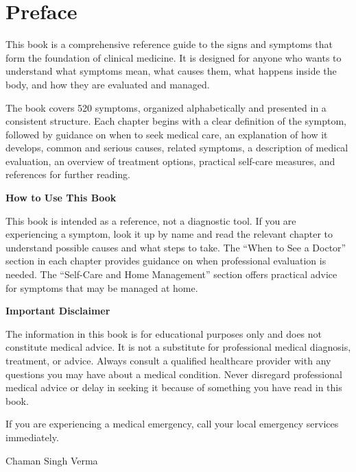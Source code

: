 \chapter*{Preface}

This book is a comprehensive reference guide to the signs and symptoms that form the foundation of clinical medicine. It is designed for anyone who wants to understand what symptoms mean, what causes them, what happens inside the body, and how they are evaluated and managed.

The book covers 520 symptoms, organized alphabetically and presented in a consistent structure. Each chapter begins with a clear definition of the symptom, followed by guidance on when to seek medical care, an explanation of how it develops, common and serious causes, related symptoms, a description of medical evaluation, an overview of treatment options, practical self-care measures, and references for further reading.

\medskip
\noindent\textbf{How to Use This Book}

This book is intended as a reference, not a diagnostic tool. If you are experiencing a symptom, look it up by name and read the relevant chapter to understand possible causes and what steps to take. The ``When to See a Doctor'' section in each chapter provides guidance on when professional evaluation is needed. The ``Self-Care and Home Management'' section offers practical advice for symptoms that may be managed at home.

\medskip
\noindent\textbf{Important Disclaimer}

The information in this book is for educational purposes only and does not constitute medical advice. It is not a substitute for professional medical diagnosis, treatment, or advice. Always consult a qualified healthcare provider with any questions you may have about a medical condition. Never disregard professional medical advice or delay in seeking it because of something you have read in this book.

If you are experiencing a medical emergency, call your local emergency services immediately.


\vspace{2em}
\noindent Chaman Singh Verma
\endinput
